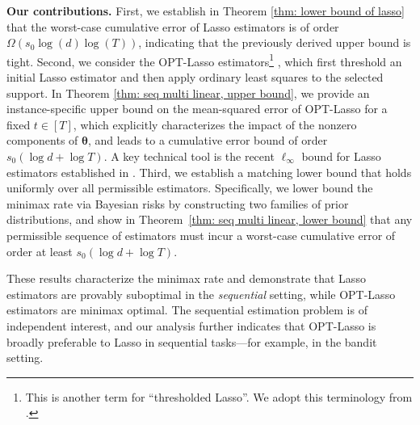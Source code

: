\documentclass[aos,preprint]{imsart}
\theoremstyle{plain}
\theoremstyle{definition}
\newcommand{\btheta}{\boldsymbol{\theta}}
\begin{document}
  
\smallskip
\noindent \textbf{Our contributions.} First, we establish in Theorem \ref{thm: lower bound of lasso} that the worst-case cumulative error of Lasso estimators is of order $\Omega(s_0 \log(d) \log(T))$, indicating that the previously derived upper bound is tight.
Second, we consider the OPT-Lasso estimators\footnote{This is another term for ``thresholded Lasso''. We adopt this terminology from \cite{belloni2013least}.} \cite{van2011adaptive, belloni2013least}, which first threshold an initial Lasso estimator and then apply ordinary least squares to the selected support. In Theorem \ref{thm: seq multi linear, upper bound}, we provide an instance-specific upper bound on the mean-squared error of OPT-Lasso for a fixed $t \in [T]$, which explicitly characterizes the impact of the nonzero components of $\btheta$, and leads to a cumulative error bound of order $s_0(\log d + \log T)$. A key technical tool is the recent $\ell_{\infty}$ bound for Lasso estimators established in \cite{bellec2022biasing}.
Third, we establish a matching lower bound that holds uniformly over all permissible estimators. Specifically, we lower bound the minimax rate via Bayesian risks by constructing two families of prior distributions, and show in Theorem~\ref{thm: seq multi linear, lower bound} that any permissible sequence of estimators must incur a worst-case cumulative error of order at least $s_0(\log d + \log T)$. 


These results characterize the minimax rate and demonstrate that Lasso estimators are provably suboptimal in the \textit{sequential} setting, while OPT-Lasso estimators are minimax optimal. The sequential estimation problem is of independent interest, and our analysis further indicates that OPT-Lasso is broadly preferable to Lasso in sequential tasks---for example, in the bandit setting.
\end{document}
